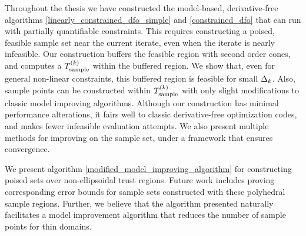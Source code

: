 
Throughout the thesis we have constructed the model-based, derivative-free algorithms \cref{linearly_constrained_dfo_simple} and \cref{constrained_dfo}
that can run with partially quantifiable constraints.
This requires constructing a poised, feasible sample set near the current iterate, even when the iterate is nearly infeasible.
Our construction buffers the feasible region with second order cones, and computes a ${T_{\text{sample}}^{(k)}}$ within the buffered region.
We show that, even for general non-linear constraints, this buffered region is feasible for small $\Delta_k$.
Also, sample points can be constructed within ${T_{\text{sample}}^{(k)}}$ with only slight modifications to classic model improving algorithms.
Although our construction has minimal performance alterations, it fairs well to classic derivative-free optimization codes,
and makes fewer infeasible evaluation attempts.
We also present multiple methods for improving on the sample set, under a framework that ensures convergence.

We present algorithm \cref{modified_model_improving_algorithm} for constructing poised sets over non-ellipsoidal trust regions.
Future work includes proving corresponding error bounds for sample sets constructed with these polyhedral sample regions.
Further, we believe that the algorithm presented naturally facilitates a model improvement algorithm that reduces the number of sample points for thin domains.
